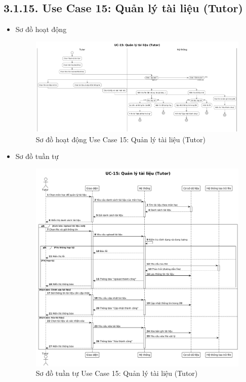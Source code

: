 \subsection*{3.1.15. Use Case 15: Quản lý tài liệu (Tutor)}
\begin{itemize}
    \item Sơ đồ hoạt động
    \begin{figure}[H]
    \centering
    \includegraphics[scale=0.28 ]{Picture/ACUC15.png}
    \caption{Sơ đồ hoạt động Use Case 15: Quản lý tài liệu (Tutor)}
    \end{figure}
    \item Sơ đồ tuần tự
    \begin{figure}[H]
    \centering
    \includegraphics[scale=0.35 ]{Picture/SEUC15.png}
    \caption{Sơ đồ tuần tự Use Case 15: Quản lý tài liệu (Tutor)}
    \end{figure}
\end{itemize}
